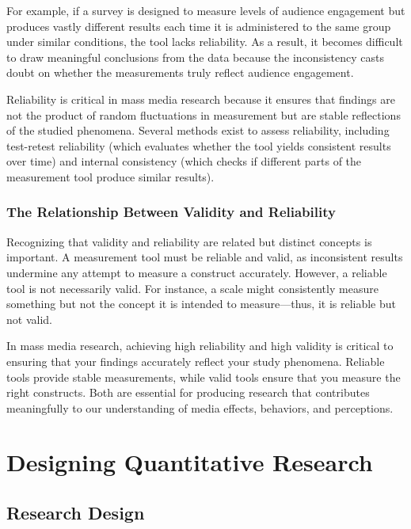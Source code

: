 \documentclass[
]{book}
\begin{document}
For example, if a survey is designed to measure levels of audience engagement but produces vastly different results each time it is administered to the same group under similar conditions, the tool lacks reliability. As a result, it becomes difficult to draw meaningful conclusions from the data because the inconsistency casts doubt on whether the measurements truly reflect audience engagement.

Reliability is critical in mass media research because it ensures that findings are not the product of random fluctuations in measurement but are stable reflections of the studied phenomena. Several methods exist to assess reliability, including test-retest reliability (which evaluates whether the tool yields consistent results over time) and internal consistency (which checks if different parts of the measurement tool produce similar results).

\subsection*{The Relationship Between Validity and Reliability}\label{the-relationship-between-validity-and-reliability}

Recognizing that validity and reliability are related but distinct concepts is important. A measurement tool must be reliable and valid, as inconsistent results undermine any attempt to measure a construct accurately. However, a reliable tool is not necessarily valid. For instance, a scale might consistently measure something but not the concept it is intended to measure---thus, it is reliable but not valid.

In mass media research, achieving high reliability and high validity is critical to ensuring that your findings accurately reflect your study phenomena. Reliable tools provide stable measurements, while valid tools ensure that you measure the right constructs. Both are essential for producing research that contributes meaningfully to our understanding of media effects, behaviors, and perceptions.

\chapter{Designing Quantitative Research}\label{designing-quantitative-research}

\section{Research Design}\label{research-design}
\end{document}
